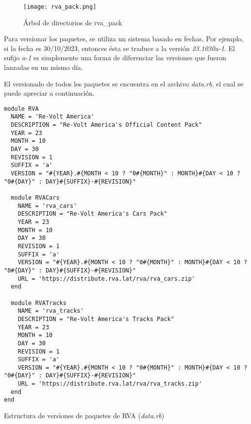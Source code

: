 \begin{figure}[H]
  \begin{center}
    \texttt{[image: rva\_pack.png]}
  \end{center}
  \caption[Árbol de directorios de rva\_pack]{Árbol de directorios de rva\_pack}
  \label{fig:rva_pack.png}
\end{figure}

Para versionar los paquetes, se utiliza un sistema basado en fechas. Por ejemplo, si la fecha es 30/10/2023, entonces ésta se traduce a la versión \textit{23.1030a-1}. El sufijo \textit{a-1} es simplemente una forma de diferenciar las versiones que fueron lanzadas en un mismo día.

\newpage

El versionado de todos los paquetes se encuentra en el archivo \textit{data.rb}, el cual se puede apreciar a continuación.

\begin{longlisting}
  \begin{verbatim}  
module RVA
  NAME = 'Re-Volt America'
  DESCRIPTION = "Re-Volt America's Official Content Pack"
  YEAR = 23
  MONTH = 10
  DAY = 30
  REVISION = 1
  SUFFIX = 'a'
  VERSION = "#{YEAR}.#{MONTH < 10 ? "0#{MONTH}" : MONTH}#{DAY < 10 ? "0#{DAY}" : DAY}#{SUFFIX}-#{REVISION}"
  
  module RVACars
    NAME = 'rva_cars'
    DESCRIPTION = "Re-Volt America's Cars Pack"
    YEAR = 23
    MONTH = 10
    DAY = 30
    REVISION = 1
    SUFFIX = 'a'
    VERSION = "#{YEAR}.#{MONTH < 10 ? "0#{MONTH}" : MONTH}#{DAY < 10 ? "0#{DAY}" : DAY}#{SUFFIX}-#{REVISION}"
    URL = 'https://distribute.rva.lat/rva/rva_cars.zip'
  end
  
  module RVATracks
    NAME = 'rva_tracks'
    DESCRIPTION = "Re-Volt America's Tracks Pack"
    YEAR = 23
    MONTH = 10
    DAY = 30
    REVISION = 1
    SUFFIX = 'a'
    VERSION = "#{YEAR}.#{MONTH < 10 ? "0#{MONTH}" : MONTH}#{DAY < 10 ? "0#{DAY}" : DAY}#{SUFFIX}-#{REVISION}"
    URL = 'https://distribute.rva.lat/rva/rva_tracks.zip'
  end
end
  \end{verbatim}
  \caption[Versionado de Paquetes de RVA]{Estructura de versiones de paquetes de RVA (\textit{data.rb})}
\end{longlisting}

\newpage

